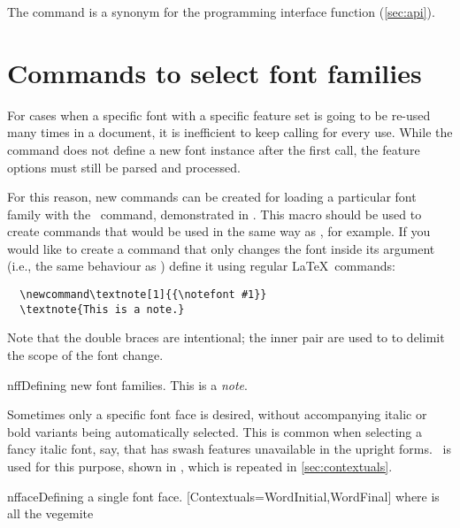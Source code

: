 The  command is a synonym for the programming interface function  (\vref*{sec:api}).



\section{Commands to select font families}


\noindent For cases when a specific font with a specific
feature set is going to be re-used many times in a document, it is inefficient
to keep calling  for every use. While the  command does not define
a new font instance after the first call, the feature options must still be
parsed and processed.

\DescribeMacro{\newfontfamily}
For this reason, new commands can be created for loading a particular font
family with the \cmd\newfontfamily\ command, demonstrated in .
This macro should be used to create commands that would be used in
the same way as \cmd\rmfamily, for example.
If you would like to create a command that only changes the font
inside its argument (i.e., the same behaviour as ) define it using regular \LaTeX\
commands:
\begin{Verbatim}
  \newcommand\textnote[1]{{\notefont #1}}
  \textnote{This is a note.}
\end{Verbatim}
Note that the double braces are intentional; the inner pair are used to
to delimit the scope of the font change.

\begin{Lexample}{nff}{Defining new font families.}
  \newfontfamily{}
  \notefont This is a \emph{note}.
\end{Lexample}

\DescribeMacro{\newfontface}
Sometimes only a specific font face is desired, without accompanying italic or bold variants
being automatically selected.
This is common when selecting a fancy italic font, say, that has swash features unavailable
in the upright forms. \cmd\newfontface\ is used for this purpose, shown
in \exref{nfface}, which is repeated in \vref{sec:contextuals}.

\begin{Xexample}{nfface}{Defining a single font face.}
  \newfontface{}%
      [Contextuals={WordInitial,WordFinal}]
  \fancy where is all the vegemite
\end{Xexample}

